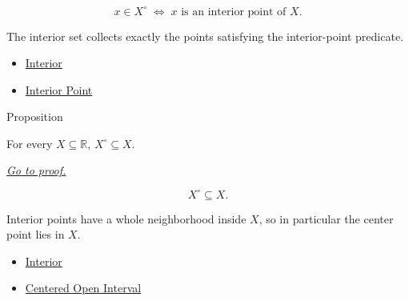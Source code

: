 \begin{remark*}
\[
  x\in X^\circ
  \;\Longleftrightarrow\;
  x\text{ is an interior point of }X.
\]
\end{remark*}

\begin{remark*}[Interpretation]
The interior set collects exactly the points satisfying the interior-point
predicate.
\end{remark*}

\begin{dependencies}
\begin{itemize}
  \item \hyperref[def:interior-r]{Interior}
  \item \hyperref[def:interior-point-r]{Interior Point}
\end{itemize}
\end{dependencies}

\begin{propositionbox}{Proposition}
\begin{proposition}
\label{prop:interior-is-contained-in-set}
For every \(X\subseteq\mathbb{R}\), \(X^\circ\subseteq X\).

\smallskip\noindent
\hyperref[prf:interior-is-contained-in-set]{\textit{Go to proof.}}
\end{proposition}
\end{propositionbox}

\begin{remark*}
\[
  X^\circ\subseteq X.
\]
\end{remark*}

\begin{remark*}[Interpretation]
Interior points have a whole neighborhood inside \(X\), so in particular the
center point lies in \(X\).
\end{remark*}

\begin{dependencies}
\begin{itemize}
  \item \hyperref[def:interior-r]{Interior}
  \item \hyperref[def:epsilon-neighbourhood]{Centered Open Interval}
\end{itemize}
\end{dependencies}

